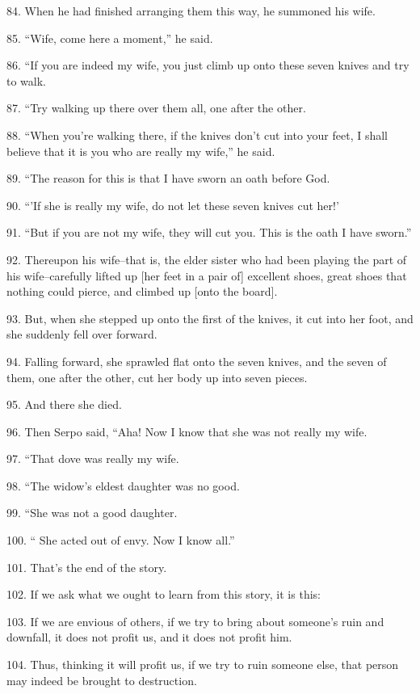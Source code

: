 84. When he had finished arranging them this way, he summoned his wife.

85. ``Wife, come here a moment,'' he said.

86. ``If you are indeed my wife, you just climb up onto these seven knives
and try to walk.

87. ``Try walking up there over them all, one after the other.

88. ``When you're walking there, if the knives don't cut into your feet,
I shall believe that it is you who are really my wife,'' he said.

89. ``The reason for this is that I have sworn an oath before God.

90. ``'If she is really my wife, do not let these seven knives cut her!'

91. ``But if you are not my wife, they will cut you. This is the oath
I have sworn.''

92. Thereupon his wife--that is, the elder sister who had been playing the part
of his wife--carefully lifted up [her feet in a pair of] excellent shoes, great
shoes that nothing could pierce, and climbed up [onto the board].

93. But, when she stepped up onto the first of the knives, it cut into her foot,
and she suddenly fell over forward.

94. Falling forward, she sprawled flat onto the seven knives, and the seven of
them, one after the other, cut her body up into seven pieces.

95. And there she died.

96. Then Serpo said, ``Aha! Now I know that she was not really my wife.

97. ``That dove was really my wife.

98. ``The widow's eldest daughter was no good.

99. ``She was not a good daughter.

100. `` She acted out of envy. Now I know all.''

101. That's the end of the story.

102. If we ask what we ought to learn from this story, it is this:

103. If we are envious of others, if we try to bring about someone's ruin and downfall,
it does not profit us, and it does not profit him.

104. Thus, thinking it will profit us, if we try to ruin someone else, that person
may indeed be brought to destruction.

